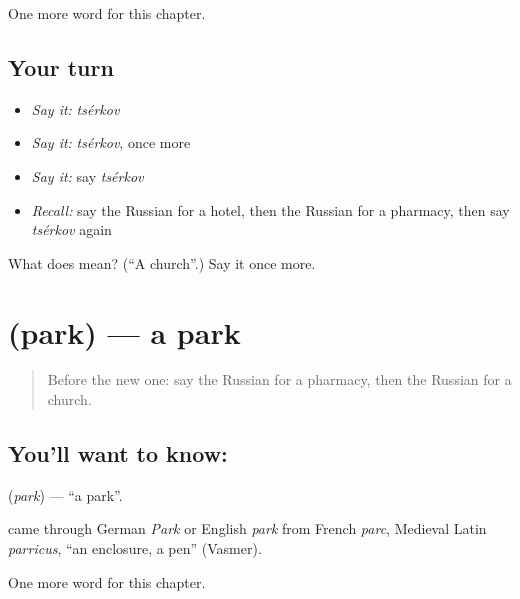 \begin{grammarlens}[title={What you've built}]
One more word for this chapter.
\end{grammarlens}

\subsection*{Your turn}
\begin{itemize}
\raggedright
  \item \emph{Say it:} \emph{tsérkov}
  \item \emph{Say it:} \emph{tsérkov}, once more
  \item \emph{Say it:} say \emph{tsérkov}
  \item \emph{Recall:} say the Russian for a hotel, then the Russian for a pharmacy, then say \emph{tsérkov} again
\end{itemize}

\begin{tcolorbox}[breakable,colback=teal!4,colframe=teal!35!black,title={Before you move on}]
What does  mean? (\textquotedblleft{}A church\textquotedblright{}.) Say it once more.
\end{tcolorbox}
\section[\texorpdfstring{\ru{парк} (park)}{парк (park)}]{ (park) — a park}

\label{lesson:RU-C80-park}



\begin{quote}
Before the new one: say the Russian for a pharmacy, then the Russian for a church.
\end{quote}

\subsection*{You'll want to know: }
\textbf{} (\emph{park}) — \textquotedblleft{}a park\textquotedblright{}.

\begin{cousinweb}
\textbf{} came through German \emph{Park} or English \emph{park} from French \emph{parc}, Medieval Latin \emph{parricus}, \textquotedblleft{}an enclosure, a pen\textquotedblright{} (Vasmer).
\end{cousinweb}

\begin{grammarlens}[title={What you've built}]
One more word for this chapter.
\end{grammarlens}

